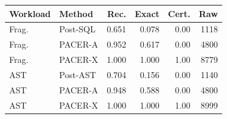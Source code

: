\begin{tabular}{llrrrr}
\toprule
Workload & Method & Rec. & Exact & Cert. & Raw\\
\midrule
Frag. & Post-SQL & 0.651 & 0.078 & 0.00 & 1118\\
Frag. & PACER-A & 0.952 & 0.617 & 0.00 & 4800\\
Frag. & PACER-X & 1.000 & 1.000 & 1.00 & 8779\\
AST & Post-AST & 0.704 & 0.156 & 0.00 & 1140\\
AST & PACER-A & 0.948 & 0.588 & 0.00 & 4800\\
AST & PACER-X & 1.000 & 1.000 & 1.00 & 8999\\
\bottomrule
\end{tabular}